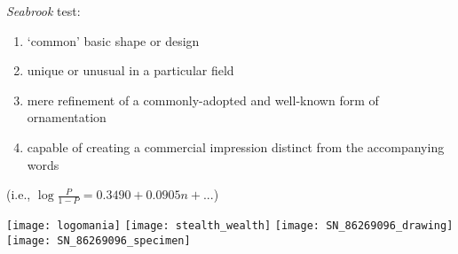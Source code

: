 \documentclass[aspectratio=1610]{beamer}
\begin{document}
\begin{frame}

\textit{Seabrook} test:

\begin{enumerate}

\item `common' basic shape or design
\item unique or unusual in a particular field
\item mere refinement of a commonly-adopted and well-known form of ornamentation
\item capable of creating a commercial impression distinct from the accompanying words \

\end{enumerate}

\vspace{1cm}



\vspace{0.5cm}

\centering

(i.e., $\log{\frac{P}{1-P}}=0.3490+0.0905n+...$)

\end{frame}

\begin{frame}

\centering

\texttt{[image: logomania]}
\texttt{[image: stealth\_wealth]}
\texttt{[image: SN\_86269096\_drawing]}
\texttt{[image: SN\_86269096\_specimen]}

\end{frame}
\end{document}
